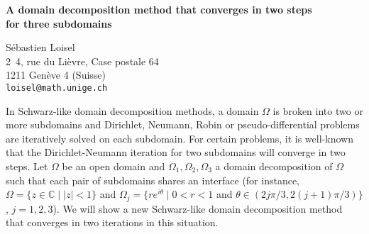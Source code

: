 \documentclass{report}
\newcommand{\Cplex}{\mathbb{C}}
\begin{document}

\begin{center}
{\large
{\bf A domain decomposition method that converges in two steps \\
	for three subdomains}}

	S\'ebastien Loisel \\
	2~4, rue du Li\`evre, Case postale 64 \\
	1211 Gen\`eve 4 (Suisse) \\
	{\tt loisel@math.unige.ch}
\end{center}
In Schwarz-like domain decomposition methods, a domain
$\Omega$ is broken into two or more subdomains and
Dirichlet, Neumann, Robin or pseudo-differential problems
are iteratively solved on each subdomain. For certain
problems, it is well-known that the Dirichlet-Neumann
iteration for two subdomains will converge in two steps. Let
$\Omega$ be an open domain and
$\Omega_{1},\Omega_{2},\Omega_{3}$ a domain decomposition of
$\Omega$ such that each pair of subdomains shares an
interface (for instance,
$\Omega=\{ z\in\Cplex \;|\; |z|<1\}$
and $\Omega_{j}=\{ re^{i\theta} \;|\; 0<r<1$ and
$\theta\in(2j\pi/3,2(j+1)\pi/3)\}$,
$j=1,2,3$).
We will show a new Schwarz-like domain decomposition
method that converges in two iterations in this situation.



\end{document}
